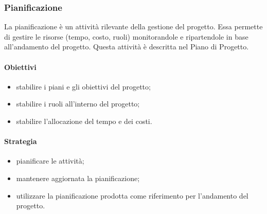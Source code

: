     \subsubsection{Pianificazione}
        La pianificazione è un attività rilevante della gestione del progetto. Essa permette di gestire le risorse (tempo, costo, ruoli) monitorandole e ripartendole in base all'andamento del progetto.
        Questa attività è descritta nel Piano di Progetto.
        \paragraph{Obiettivi}
            \begin{itemize}
                \item stabilire i piani e gli obiettivi del progetto;
                \item stabilire i ruoli all'interno del progetto;
                \item stabilire l'allocazione del tempo e dei costi.
            \end{itemize}
        \paragraph{Strategia}
            \begin{itemize}
                \item pianificare le attività;
                \item mantenere aggiornata la pianificazione;
                \item utilizzare la pianificazione prodotta come riferimento per l'andamento del progetto.
            \end{itemize}
